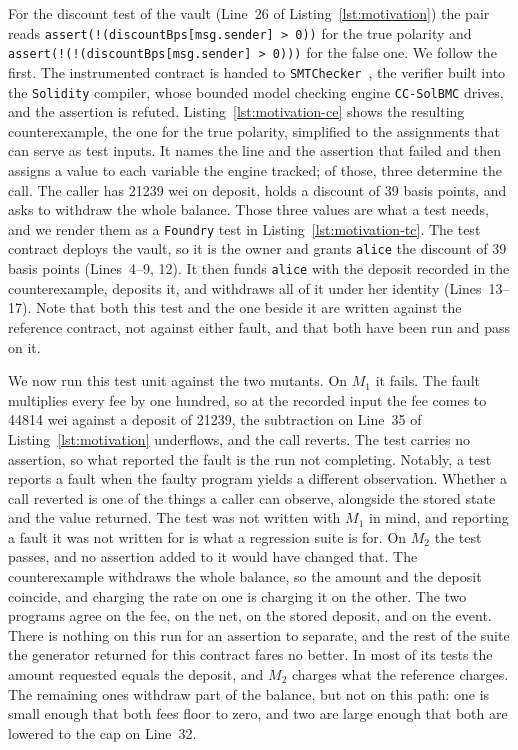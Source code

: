 \documentclass[manuscript,anonymous]{acmart}
\newcommand{\tool}[1]{\texttt{#1}}
\begin{document}
For the discount test of the vault (Line~26 of
Listing~\ref{lst:motivation}) the pair reads
\texttt{assert(!(discountBps[msg.sender] > 0))} for the true polarity and
\texttt{assert(!(!(discountBps[msg.sender] > 0)))} for the false one. We follow
the first. The instrumented contract is handed to
\tool{SMTChecker}~\cite{smtchecker}, the verifier built into the \tool{Solidity}
compiler, whose bounded model checking engine \tool{CC-SolBMC} drives, and the
assertion is refuted. Listing~\ref{lst:motivation-ce} shows the resulting
counterexample, the one for the true polarity, simplified to the assignments
that can serve as test inputs. It names the line and the assertion that failed
and then assigns a value to each variable the engine tracked; of those, three
determine the call. The caller has 21239 wei on deposit, holds a discount of 39
basis points, and asks to withdraw the whole balance. Those three values are
what a test needs, and we render them as a \tool{Foundry} test in
Listing~\ref{lst:motivation-tc}. The test contract deploys the vault, so it is
the owner and grants \texttt{alice} the discount of 39 basis points
(Lines~4--9, 12). It then funds \texttt{alice} with the deposit recorded in the
counterexample, deposits it, and withdraws all of it under her identity
(Lines~13--17). Note that both this test and the one beside it are written
against the reference contract, not against either fault, and that both have
been run and pass on it.

We now run this test unit against the two mutants. On $M_1$ it fails. The fault
multiplies every fee by one hundred, so at the recorded input the fee comes to
44814 wei against a deposit of 21239, the subtraction on Line~35 of
Listing~\ref{lst:motivation} underflows, and the call reverts. The test carries
no assertion, so what reported the fault is the run not completing. Notably, a
test reports a fault when the faulty program yields a different observation.
Whether a call reverted is one of the things a caller can observe, alongside
the stored state and the value returned. The test was not written with $M_1$ in
mind, and reporting a fault it was not written for is what a regression suite
is for. On $M_2$ the test passes, and no assertion added to it would have
changed that. The counterexample withdraws the whole balance, so the amount and
the deposit coincide, and charging the rate on one is charging it on the other.
The two programs agree on the fee, on the net, on the stored deposit, and on
the event. There is nothing on this run for an assertion to separate, and the rest of the
suite the generator returned for this contract fares no better. In most of its
tests the amount requested equals the deposit, and $M_2$ charges what the
reference charges. The remaining ones withdraw part of the balance, but not on
this path: one is small enough that both fees floor to zero, and two are large
enough that both are lowered to the cap on Line~32.
\end{document}
